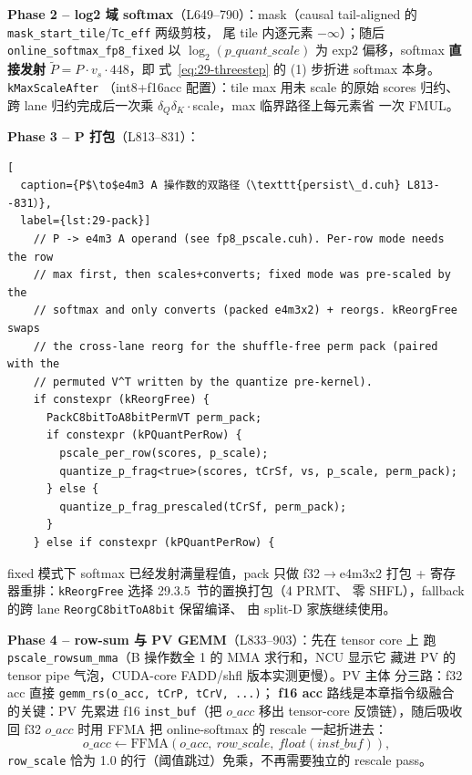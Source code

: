 \textbf{Phase 2 -- log2 域 softmax}（L649--790）：mask（causal
tail-aligned 的 \texttt{mask\_start\_tile}/\texttt{Tc\_eff} 两级剪枝，
尾 tile 内逐元素 $-\infty$）；随后
\texttt{online\_softmax\_fp8\_fixed} 以 $\log_2(p\_quant\_scale)$ 为
exp2 偏移，softmax \textbf{直接发射} $\tilde P = P\cdot v_s\cdot448$，即
式~\ref{eq:29-threestep} 的 (1) 步折进 softmax 本身。\texttt{kMaxScaleAfter}
（int8+f16acc 配置）：tile max 用未 scale 的原始 scores 归约、跨 lane
归约完成后一次乘 $\delta_Q\delta_K\cdot$scale，max 临界路径上每元素省
一次 FMUL。

\textbf{Phase 3 -- P 打包}（L813--831）：

\begin{lstlisting}[
  caption={P$\to$e4m3 A 操作数的双路径（\texttt{persist\_d.cuh} L813--831）},
  label={lst:29-pack}]
    // P -> e4m3 A operand (see fp8_pscale.cuh). Per-row mode needs the row
    // max first, then scales+converts; fixed mode was pre-scaled by the
    // softmax and only converts (packed e4m3x2) + reorgs. kReorgFree swaps
    // the cross-lane reorg for the shuffle-free perm pack (paired with the
    // permuted V^T written by the quantize pre-kernel).
    if constexpr (kReorgFree) {
      PackC8bitToA8bitPermVT perm_pack;
      if constexpr (kPQuantPerRow) {
        pscale_per_row(scores, p_scale);
        quantize_p_frag<true>(scores, tCrSf, vs, p_scale, perm_pack);
      } else {
        quantize_p_frag_prescaled(tCrSf, perm_pack);
      }
    } else if constexpr (kPQuantPerRow) {
\end{lstlisting}

fixed 模式下 softmax 已经发射满量程值，pack 只做 f32$\to$e4m3x2 打包 +
寄存器重排：\texttt{kReorgFree} 选择 29.3.5~节的置换打包（4 PRMT、
零 SHFL），fallback 的跨 lane \texttt{ReorgC8bitToA8bit} 保留编译、
由 split-D 家族继续使用。

\textbf{Phase 4 -- row-sum 与 PV GEMM}（L833--903）：先在 tensor core 上
跑 \texttt{pscale\_rowsum\_mma}（B 操作数全 1 的 MMA 求行和，NCU 显示它
藏进 PV 的 tensor pipe 气泡，CUDA-core FADD/shfl 版本实测更慢）。PV 主体
分三路：f32 acc 直接 \texttt{gemm\_rs(o\_acc, tCrP, tCrV, ...)}；
\textbf{f16 acc} 路线是本章指令级融合的关键：PV 先累进 f16
\texttt{inst\_buf}（把 $o\_acc$ 移出 tensor-core 反馈链），随后吸收回
f32 $o\_acc$ 时用 FFMA 把 online-softmax 的 rescale 一起折进去：
\begin{equation}
  o\_acc \leftarrow \mathrm{FFMA}(o\_acc,\ row\_scale,\ float(inst\_buf)),
\end{equation}
\texttt{row\_scale} 恰为 1.0 的行（阈值跳过）免乘，不再需要独立的 rescale pass。

